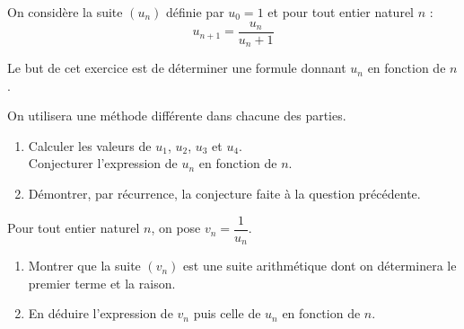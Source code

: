 
On considère la suite $(u_n)$ définie par $u_0=1$ et pour tout entier naturel $n$ :
\[ u_{n+1}=\dfrac{u_n}{u_n+1} \]
\par
Le but de cet exercice est de déterminer une formule donnant $u_n$ en fonction de $n$.
\par
On utilisera une méthode différente dans chacune des  parties.
\begin{enumerate}
     \item %
     Calculer les valeurs de $u_1$, $u_2$, $u_3$ et $u_4$.
     \\
     Conjecturer l'expression de $u_n$ en fonction de $n$.
     \item %
     Démontrer, par récurrence, la conjecture faite à la question précédente.
\end{enumerate}
Pour tout entier naturel $n$, on pose $v_n=\dfrac{1}{u_n}$.
\begin{enumerate}
     \item %
     Montrer que la suite $(v_n)$ est une suite arithmétique dont on déterminera le premier terme et la raison.
     \item %
     En déduire l'expression de $v_n$ puis celle de $u_n$ en fonction de $n$.
\end{enumerate}
